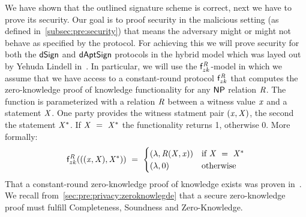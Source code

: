 We have shown that the outlined signature scheme is correct, next we have to prove its security.
Our goal is to proof security in the malicious setting (as defined in~\ref{subsec:pre:security}) that means the adversary might or might not behave as specified by the protocol.
For achieving this we will prove security for both the $\mathsf{dSign}$ and $\mathsf{dAptSign}$ protocols in the hybrid model which was layed out by Yehuda Lindell in~\cite{lindell2017simulate}.
In particular, we will use the $\mathsf{f}^{\mathit{R}}_{zk}$-model in which we assume that we have access to a constant-round protocol $\mathsf{f}^{\mathit{R}}_{zk}$ that computes the zero-knowledge proof of knowledge functionality for any $\mathsf{NP}$ relation $\mathit{R}$.
The function is parameterized with a relation $\mathit{R}$ between a witness value $\mathit{x}$ and a statement $\mathit{X}$.
One party provides the witness statment pair $(\mathit{x}, \mathit{X})$, the second the statement $\mathit{X}^*$.
If $\mathit{X} ~=~ \mathit{X}^*$ the functionality returns 1, otherwise 0.
More formally:
\[
    \mathsf{f}^{\mathit{R}}_{zk}(((\mathit{x}, \mathit{X}), \mathit{X}^*)) ~=~
    \begin{cases}
        (\lambda, \mathit{R}(\mathit{X}, \mathit{x})) & \text{if } \mathit{X} ~=~ \mathit{X}^* \\
        (\lambda, 0) &\text{otherwise}
    \end{cases}
\]
That a constant-round zero-knowledge proof of knowledge exists was proven in~\cite{lindell2013note}.
We recall from~\ref{sec:pre:privacy:zeroknowlegde} that a secure zero-knowledge proof must fulfill Completeness, Soundness and Zero-Knowledge.

